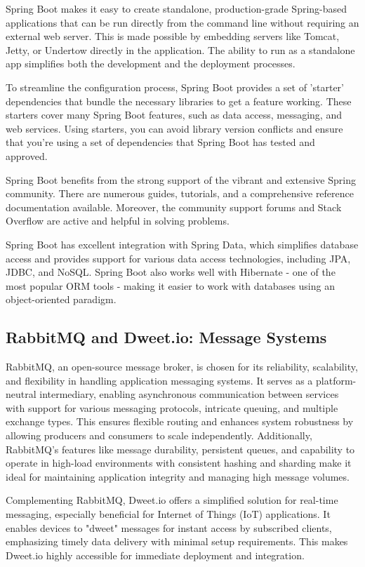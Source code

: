 Spring Boot makes it easy to create standalone, production-grade Spring-based applications that can be run directly from the command line without requiring an external web server. 
This is made possible by embedding servers like Tomcat, Jetty, or Undertow directly in the application. 
The ability to run as a standalone app simplifies both the development and the deployment processes.

To streamline the configuration process, Spring Boot provides a set of 'starter' dependencies that bundle the necessary libraries to get a feature working. 
These starters cover many Spring Boot features, such as data access, messaging, and web services. 
Using starters, you can avoid library version conflicts and ensure that you're using a set of dependencies that Spring Boot has tested and approved.

Spring Boot benefits from the strong support of the vibrant and extensive Spring community. 
There are numerous guides, tutorials, and a comprehensive reference documentation available. 
Moreover, the community support forums and Stack Overflow are active and helpful in solving problems.

Spring Boot has excellent integration with Spring Data, which simplifies database access and provides support for various data access technologies, including JPA, JDBC, and NoSQL. 
Spring Boot also works well with Hibernate - one of the most popular ORM tools - making it easier to work with databases using an object-oriented paradigm.

\subsection{RabbitMQ and Dweet.io: Message Systems}

RabbitMQ, an open-source message broker, is chosen for its reliability, scalability, and flexibility in handling application messaging systems. It serves as a platform-neutral intermediary, enabling asynchronous communication between services with support for various messaging protocols, intricate queuing, and multiple exchange types. This ensures flexible routing and enhances system robustness by allowing producers and consumers to scale independently. Additionally, RabbitMQ's features like message durability, persistent queues, and capability to operate in high-load environments with consistent hashing and sharding make it ideal for maintaining application integrity and managing high message volumes.

Complementing RabbitMQ, Dweet.io offers a simplified solution for real-time messaging, especially beneficial for Internet of Things (IoT) applications. It enables devices to "dweet" messages for instant access by subscribed clients, emphasizing timely data delivery with minimal setup requirements. This makes Dweet.io highly accessible for immediate deployment and integration.

